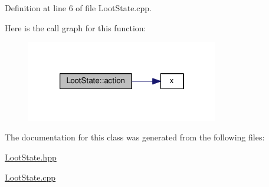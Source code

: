 Definition at line 6 of file Loot\-State.\-cpp.



Here is the call graph for this function\-:\nopagebreak
\begin{figure}[H]
\begin{center}
\leavevmode
\includegraphics[width=238pt]{class_loot_state_a35ac3a3825b8da2572f72c25e714cf44_cgraph}
\end{center}
\end{figure}




The documentation for this class was generated from the following files\-:\begin{DoxyCompactItemize}
\item 
\hyperlink{_loot_state_8hpp}{Loot\-State.\-hpp}\item 
\hyperlink{_loot_state_8cpp}{Loot\-State.\-cpp}\end{DoxyCompactItemize}
